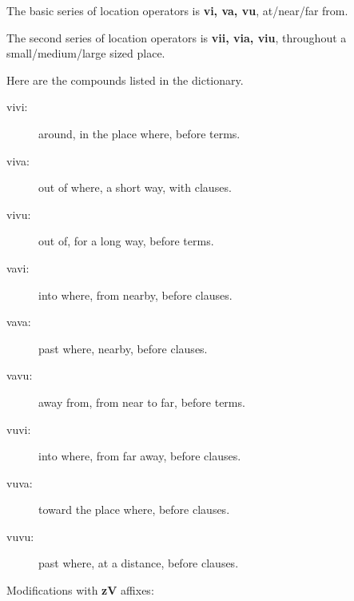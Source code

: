 \documentclass[12pt]{book}
\begin{document}
The basic series of location operators is {\bf vi, va, vu}, at/near/far from.

The second series of location operators is {\bf vii, via, viu}, throughout a small/medium/large sized place.

Here are the compounds listed in the dictionary.

\begin{description}

\item[vivi:]  around, in the place where, before terms.

\item[viva:]  out of where, a short way, with clauses.

\item[vivu:]  out of, for a long way, before terms.

\item[vavi:]  into where, from nearby, before clauses.

\item[vava:]  past where, nearby, before clauses.

\item[vavu:]  away from, from near to far, before terms.

\item[vuvi:]  into where, from far away, before clauses.

\item[vuva:]   toward the place where, before clauses.

\item[vuvu:]  past where, at a distance, before clauses.


\end{description}

Modifications with {\bf zV} affixes:
\end{document}
